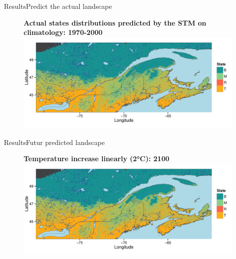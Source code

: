 \documentclass[10pt,aspectratio=149]{beamer}
\begin{document}

\begin{frame}[t]{Results}{Predict the actual landscape}

		\begin{figure}
			\centering\textbf{Actual states distributions predicted by the STM on climatology: 1970-2000}
			\includegraphics[width=0.9\paperwidth]{Figs/338_500ts_final_land.pdf}
		\end{figure}


\end{frame}



\begin{frame}[t]{Results}{Futur predicted landscape}

		\begin{figure}
			\centering\textbf{Temperature increase linearly (2°C): 2100}
			\includegraphics[width=0.9\paperwidth]{Figs/338_withcc_final_land.pdf}
		\end{figure}

\end{frame}



\end{document}
